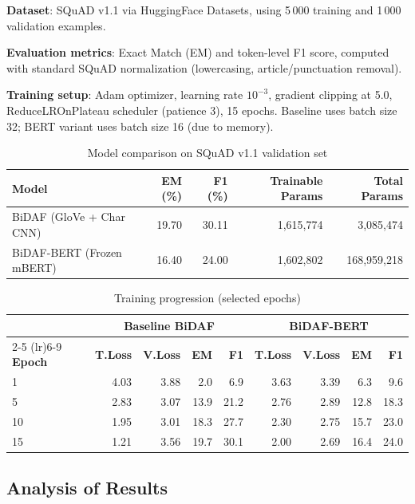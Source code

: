 \documentclass[10pt,a4paper]{article}
\begin{document}
\textbf{Dataset}: SQuAD v1.1 via HuggingFace Datasets, using 5\,000 training and 1\,000 validation examples.

\textbf{Evaluation metrics}: Exact Match (EM) and token-level F1 score, computed with standard SQuAD normalization (lowercasing, article/punctuation removal).

\textbf{Training setup}: Adam optimizer, learning rate $10^{-3}$, gradient clipping at 5.0, ReduceLROnPlateau scheduler (patience 3), 15 epochs. Baseline uses batch size 32; BERT variant uses batch size 16 (due to memory).

\begin{table}[H]
\centering
\caption{Model comparison on SQuAD v1.1 validation set}
\label{tab:task2-comparison}
\begin{tabular}{lrrrr}
\toprule
\textbf{Model} & \textbf{EM (\%)} & \textbf{F1 (\%)} & \textbf{Trainable Params} & \textbf{Total Params} \\
\midrule
BiDAF (GloVe + Char CNN) & 19.70 & 30.11 & 1,615,774 & 3,085,474 \\
BiDAF-BERT (Frozen mBERT) & 16.40 & 24.00 & 1,602,802 & 168,959,218 \\
\bottomrule
\end{tabular}
\end{table}

\begin{table}[H]
\centering
\caption{Training progression (selected epochs)}
\label{tab:task2-epochs}
\begin{tabular}{lrrrrrrrr}
\toprule
& \multicolumn{4}{c}{\textbf{Baseline BiDAF}} & \multicolumn{4}{c}{\textbf{BiDAF-BERT}} \\
\cmidrule(lr){2-5} \cmidrule(lr){6-9}
\textbf{Epoch} & \textbf{T.Loss} & \textbf{V.Loss} & \textbf{EM} & \textbf{F1} & \textbf{T.Loss} & \textbf{V.Loss} & \textbf{EM} & \textbf{F1} \\
\midrule
1  & 4.03 & 3.88 & 2.0  & 6.9  & 3.63 & 3.39 & 6.3  & 9.6 \\
5  & 2.83 & 3.07 & 13.9 & 21.2 & 2.76 & 2.89 & 12.8 & 18.3 \\
10 & 1.95 & 3.01 & 18.3 & 27.7 & 2.30 & 2.75 & 15.7 & 23.0 \\
15 & 1.21 & 3.56 & 19.7 & 30.1 & 2.00 & 2.69 & 16.4 & 24.0 \\
\bottomrule
\end{tabular}
\end{table}


\subsection{Analysis of Results}
\end{document}
